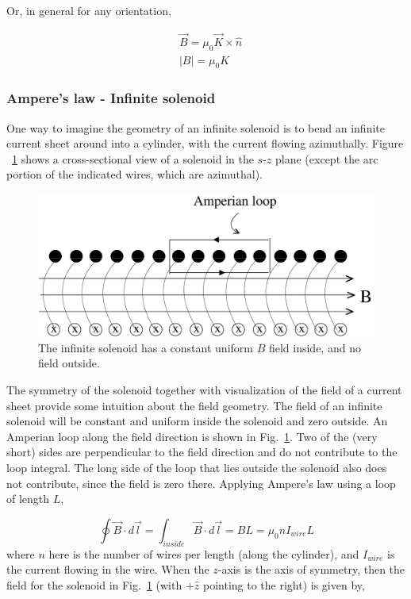 \documentclass[12pt]{article}
\begin{document}
\begin{flushleft}
Or, in general for any orientation,

\begin{equation*}
\begin{aligned}
& \vec{B} =\mu_{0}\vec{K}  \times \hat{n} \\
& |B| = \mu_{0}K
\end{aligned}
\end{equation*}

\subsubsection*{\bf Ampere's law - Infinite solenoid}

One way to imagine the geometry of an infinite solenoid is to bend an infinite current sheet around into a cylinder, with the current flowing azimuthally.  Figure ~\ref{fig:solenoid} shows a cross-sectional view of a solenoid in the $s$-$z$ plane (except the arc portion of the indicated wires, which are azimuthal).

\begin{figure}[h]
\centering
\includegraphics*[trim=0cm 0cm 0cm 0cm, clip=true, width=0.5\columnwidth]{solenoid.pdf}
\caption{\small The infinite solenoid has a constant uniform $B$ field inside, and no field outside.}
\label{fig:solenoid}
\end{figure}

The symmetry of the solenoid together with visualization of the field of a current sheet provide some intuition about the field geometry.   The field of an infinite solenoid will be constant and uniform inside the solenoid and zero outside.  An Amperian loop along the field direction is shown in Fig.~\ref{fig:solenoid}.  Two of the (very short) sides are perpendicular to the field direction and do not contribute to the loop integral.  The long side of the loop that lies outside the solenoid also does not contribute, since the field is zero there.  Applying Ampere's law using a loop of length $L$,

\[
\oint \vec{B} \cdot d\vec{l} = \int_{inside} \vec{B} \cdot d\vec{l} = BL = \mu_{0}nI_{wire}L
\]
where $n$ here is the number of wires per length (along the cylinder), and $I_{wire}$ is the current flowing in the wire.  When the $z$-axis is the axis of symmetry, then the field for the solenoid in Fig.~\ref{fig:solenoid} (with $+\hat{z}$ pointing to the right) is given by,


\end{flushleft}
\end{document}
